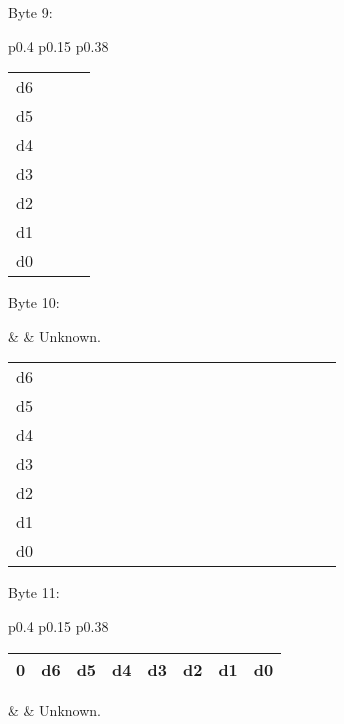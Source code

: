 Byte 9:

\begin{tabular}{p{0.4\linewidth} p{0.15\linewidth} p{0.38\linewidth}} 

\begin{tabular}{|p{0.3cm}|p{0.3cm}|p{0.3cm}|p{0.3cm}|p{0.3cm}|p{0.3cm}|p{0.3cm}|p{0.3cm}|}
\hline
0 & d6 & d5 & d4 & d3 & d2 & d1 & d0\\
\hline
\end{tabular}
&  & Unknown.\\
\end{tabular}

\begin{tabular}{p{0.05\linewidth} p{0.6\linewidth}} 
d6 & \\
d5 & \\
d4 & \\
d3 & \\
d2 & \\
d1 & \\
d0 & \\
\end{tabular}

Byte 10:

&  & Unknown.\\
\end{tabular}

\begin{tabular}{p{0.05\linewidth} p{0.6\linewidth}} 
d6 & \\
d5 & \\
d4 & \\
d3 & \\
d2 & \\
d1 & \\
d0 & \\
\end{tabular}

Byte 11:

\begin{tabular}{p{0.4\linewidth} p{0.15\linewidth} p{0.38\linewidth}} 

\begin{tabular}{|p{0.3cm}|p{0.3cm}|p{0.3cm}|p{0.3cm}|p{0.3cm}|p{0.3cm}|p{0.3cm}|p{0.3cm}|}
\hline
0 & d6 & d5 & d4 & d3 & d2 & d1 & d0\\
\hline
\end{tabular}
&  & Unknown.\\
\end{tabular}

